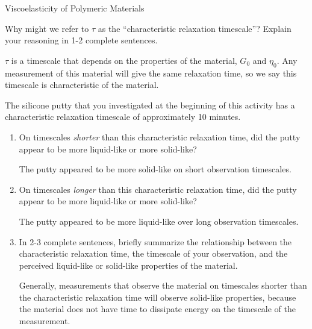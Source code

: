 \begin{activity}{Viscoelasticity of Polymeric Materials}
\begin{ctqs}
		\question Why might we refer to $\tau$ as the ``characteristic relaxation timescale''?  Explain your reasoning in 1-2 complete sentences.
	
					\begin{solution}[1.5in]
					
						$\tau$ is a timescale that depends on the properties of the material, $G_0$ and $\eta_0$.  Any measurement of this material will give the same relaxation time, so we say this timescale is characteristic of the material.
					
					\end{solution}
					
		\question The silicone putty that you investigated at the beginning of this activity has a characteristic relaxation timescale of approximately 10 minutes.
		
			\begin{enumerate}
				\item On timescales \emph{shorter} than this characteristic relaxation time, did the putty appear to be more liquid-like or more solid-like?
	
					\begin{solution}[0.75in]
					
						The putty appeared to be more solid-like on short observation timescales.
						
					\end{solution}
				
				\item On timescales \emph{longer} than this characteristic relaxation time, did the putty appear to be more liquid-like or more solid-like?
	
					\begin{solution}[0.75in]
					
						The putty appeared to be more liquid-like over long observation timescales.
						
					\end{solution}
				
				\item In 2-3 complete sentences, briefly summarize the relationship between the characteristic relaxation time, the timescale of your observation, and the perceived liquid-like or solid-like properties of the material.
	
					\begin{solution}[2.5in]
					
						Generally, measurements that observe the material on timescales shorter than the characteristic relaxation time will observe solid-like properties, because the material does not have time to dissipate energy on the timescale of the measurement.
						

\end{solution}
\end{enumerate}
\end{ctqs}
\end{activity}
